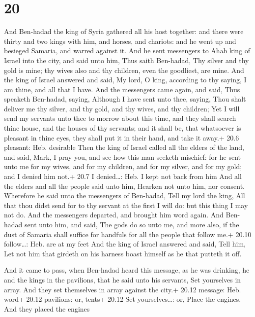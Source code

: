 \hypertarget{section-19}{%
\section{20}\label{section-19}}

 And Ben-hadad the king of Syria gathered all his host
together: and there were thirty and two kings with him, and horses, and
chariots: and he went up and besieged Samaria, and warred against it.
 And he sent messengers to Ahab king of Israel into the
city, and said unto him, Thus saith Ben-hadad,  Thy silver
and thy gold is mine; thy wives also and thy children, even the
goodliest, are mine.  And the king of Israel answered and
said, My lord, O king, according to thy saying, I am thine, and all that
I have.  And the messengers came again, and said, Thus
speaketh Ben-hadad, saying, Although I have sent unto thee, saying, Thou
shalt deliver me thy silver, and thy gold, and thy wives, and thy
children;  Yet I will send my servants unto thee to morrow
about this time, and they shall search thine house, and the houses of
thy servants; and it shall be, that whatsoever is pleasant in thine
eyes, they shall put it in their hand, and take it away.+ 20.6 pleasant:
Heb. desirable  Then the king of Israel called all the
elders of the land, and said, Mark, I pray you, and see how this man
seeketh mischief: for he sent unto me for my wives, and for my children,
and for my silver, and for my gold; and I denied him not.+ 20.7 I
denied\ldots: Heb. I kept not back from him  And all the
elders and all the people said unto him, Hearken not unto him, nor
consent.  Wherefore he said unto the messengers of
Ben-hadad, Tell my lord the king, All that thou didst send for to thy
servant at the first I will do: but this thing I may not do. And the
messengers departed, and brought him word again.  And
Ben-hadad sent unto him, and said, The gods do so unto me, and more
also, if the dust of Samaria shall suffice for handfuls for all the
people that follow me.+ 20.10 follow\ldots: Heb. are at my feet
 And the king of Israel answered and said, Tell him, Let
not him that girdeth on his harness boast himself as he that putteth it
off.

 And it came to pass, when Ben-hadad heard this message, as
he was drinking, he and the kings in the pavilions, that he said unto
his servants, Set yourselves in array. And they set themselves in array
against the city.+ 20.12 message: Heb. word+ 20.12 pavilions: or, tents+
20.12 Set yourselves\ldots: or, Place the engines. And they placed the
engines

